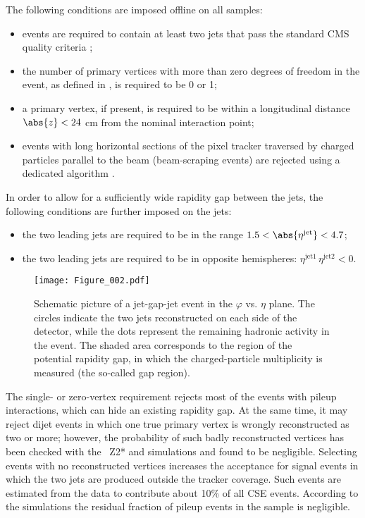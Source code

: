 \documentclass[11pt,twoside,a4paper,cmspaper,final,collab]{cms-tdr}
\begin{document}
The following conditions are imposed offline on all samples:
\begin{itemize}
\item events are required to contain at least two jets that pass the standard CMS quality criteria \cite{jq};
\item the number of primary vertices with more than zero degrees of freedom in the event, as defined in \cite{TRK-11-001}, is required to be 0 or 1;
\item a primary vertex, if present, is required to be within a longitudinal distance $\abs{z} < 24$ cm from the nominal interaction point;
\item events with long horizontal sections of the pixel tracker traversed by charged particles parallel to the beam (beam-scraping events) are rejected using a dedicated algorithm \cite{bscrap}.
\end{itemize}

In order to allow for a sufficiently wide rapidity gap between the jets, the following conditions are further imposed on the jets:
\begin{itemize}
\item the two leading jets are required to be in the range $1.5<\abs{\eta^\text{jet}}< 4.7$;
\item the two leading jets are required to be in opposite hemispheres: $\eta^\mathrm{jet1} \, \eta^\text{jet2} < 0$.
\end{itemize}

\begin{figure}
\centering
\texttt{[image: Figure\_002.pdf]}
\caption{Schematic picture of a jet-gap-jet event in the $\varphi$ vs. $\eta$ plane. The circles indicate the two jets reconstructed on each side of the detector, while the dots represent the remaining hadronic activity in the event. The shaded area corresponds to the region of the potential rapidity gap, in which the charged-particle multiplicity is measured (the so-called gap region).}
\label{lego}
\end{figure}

The single- or zero-vertex requirement rejects most of the events with pileup interactions, which can hide an existing rapidity gap. At the same time, it may reject dijet events in which one true primary vertex is wrongly reconstructed as two or more; however, the probability of such badly reconstructed vertices has been checked with the ~Z2* and  simulations and found to be negligible. Selecting events with no reconstructed vertices increases the acceptance for signal events in which the two jets are produced outside the tracker coverage. Such events are estimated from the data to contribute about 10\% of all CSE events. According to the simulations the residual fraction of pileup events in the sample is negligible.
\end{document}
